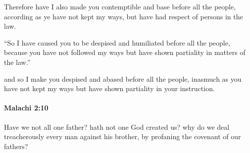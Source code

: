 			\begin{versebox}
					\item[BHS] 
					\item[LXX] 
					\item[ASV] Therefore have I also made you contemptible and base before all the people, according as ye have not kept my ways, but have had respect of persons in the law.
					\item[NIV] “So I have caused you to be despised and humiliated before all the people, because you have not followed my ways but have shown partiality in matters of the law.”
					\item[NRSV] and so I make you despised and abased before all the people, inasmuch as you have not kept my ways but have shown partiality in your instruction.
			\end{versebox}

		\paragraph{Malachi 2:10} %
			\label{MALACHI-2-10}

			Have we not all one father? hath not one God created us? why do we deal treacherously every man against his brother, by profaning the covenant of our fathers?

